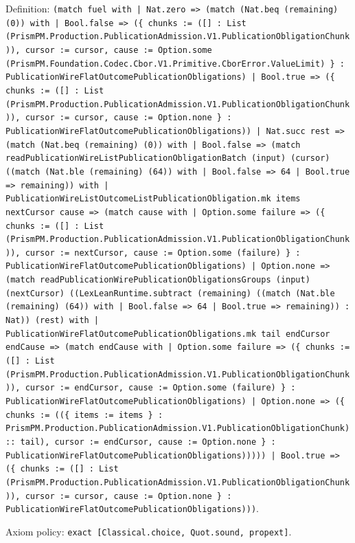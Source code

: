 \documentclass[11pt]{article}
\begin{document}
\noindent Definition: \texttt{(match fuel with | Nat.zero => (match (Nat.beq (remaining) (0)) with | Bool.false => (\{ chunks := ([] : List (PrismPM.Production.PublicationAdmission.V1.PublicationObligationChunk)), cursor := cursor, cause := Option.some (PrismPM.Foundation.Codec.Cbor.V1.Primitive.CborError.ValueLimit) \} : PublicationWireFlatOutcomePublicationObligations) | Bool.true => (\{ chunks := ([] : List (PrismPM.Production.PublicationAdmission.V1.PublicationObligationChunk)), cursor := cursor, cause := Option.none \} : PublicationWireFlatOutcomePublicationObligations)) | Nat.succ rest => (match (Nat.beq (remaining) (0)) with | Bool.false => (match readPublicationWireListPublicationObligationBatch (input) (cursor) ((match (Nat.ble (remaining) (64)) with | Bool.false => 64 | Bool.true => remaining)) with | PublicationWireListOutcomeListPublicationObligation.mk items nextCursor cause => (match cause with | Option.some failure => (\{ chunks := ([] : List (PrismPM.Production.PublicationAdmission.V1.PublicationObligationChunk)), cursor := nextCursor, cause := Option.some (failure) \} : PublicationWireFlatOutcomePublicationObligations) | Option.none => (match readPublicationWirePublicationObligationsGroups (input) (nextCursor) ((LexLeanRuntime.subtract (remaining) ((match (Nat.ble (remaining) (64)) with | Bool.false => 64 | Bool.true => remaining)) : Nat)) (rest) with | PublicationWireFlatOutcomePublicationObligations.mk tail endCursor endCause => (match endCause with | Option.some failure => (\{ chunks := ([] : List (PrismPM.Production.PublicationAdmission.V1.PublicationObligationChunk)), cursor := endCursor, cause := Option.some (failure) \} : PublicationWireFlatOutcomePublicationObligations) | Option.none => (\{ chunks := ((\{ items := items \} : PrismPM.Production.PublicationAdmission.V1.PublicationObligationChunk) :: tail), cursor := endCursor, cause := Option.none \} : PublicationWireFlatOutcomePublicationObligations))))) | Bool.true => (\{ chunks := ([] : List (PrismPM.Production.PublicationAdmission.V1.PublicationObligationChunk)), cursor := cursor, cause := Option.none \} : PublicationWireFlatOutcomePublicationObligations)))}.\par
\noindent Axiom policy: \texttt{exact [Classical.choice, Quot.sound, propext]}.\par
\end{document}
